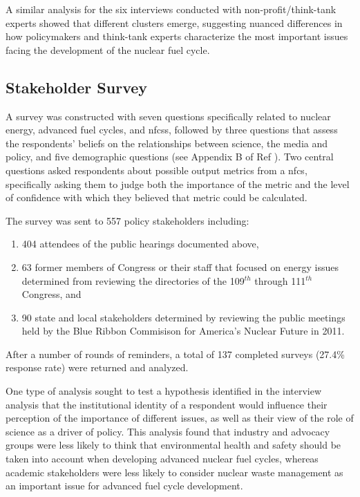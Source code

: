 A similar analysis for the six interviews conducted with non-profit/think-tank
experts showed that different clusters emerge, suggesting nuanced differences
in how policymakers and think-tank experts characterize the most important
issues facing the development of the nuclear fuel cycle.

\subsection{Stakeholder Survey}

A survey was constructed with seven questions specifically related to nuclear
energy, advanced fuel cycles, and \glspl{nfcs}, followed by three questions
that assess the respondents' beliefs on the relationships between science, the
media and policy, and five demographic questions (see Appendix
B of Ref ).  Two central questions asked respondents about possible
output metrics from a \gls{nfcs}, specifically asking them to judge both the
importance of the metric and the level of confidence with which they believed
that metric could be calculated.

The survey was sent to 557 policy stakeholders including:
\begin{enumerate}
\item 404 attendees of the public hearings documented above, 
\item 63 former members of Congress or their staff that focused on energy issues determined from reviewing the directories of the 109$^{th}$ through 111$^{th}$ Congress, and
\item 90 state and local stakeholders determined by reviewing the public
  meetings held by the Blue Ribbon Commisison for America's Nuclear Future in
  2011.
\end{enumerate}
After a number of rounds of reminders, a total of 137 completed surveys
(27.4\% response rate) were returned and analyzed.

One type of analysis sought to test a hypothesis identified in the interview
analysis that the institutional identity of a respondent would influence their
perception of the importance of different issues, as well as their view of the
role of science as a driver of policy.  This analysis found that industry and
advocacy groups were less likely to think that environmental health and safety
should be taken into account when developing advanced nuclear fuel cycles,
whereas academic stakeholders were less likely to consider nuclear waste
management as an important issue for advanced fuel cycle development.


